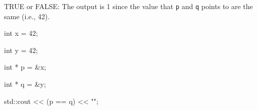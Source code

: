 TRUE or FALSE: The output is 1 since the value that \texttt{p} and \texttt{q} points to are the same (i.e., 42).



\begin{consolethree}[escapeinside=||]

int x = 42;

int y = 42;

int * p = &x;

int * q = &y;

std::cout << (p == q) << "\n";

\end{consolethree}

